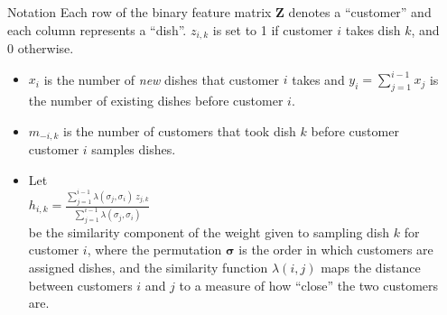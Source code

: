 \documentclass[serif,mathserif,final]{beamer}
\def\suml#1#2#3{\sum\limits_{#1=#2}^{#3}}
\def\ds{\displaystyle}
\def\hik{\ds\frac{\suml{j}{1}{i-1}\lambda(\sigma_j,\sigma_i)~z_{j,k}}
        {\suml{j}{1}{i-1}\lambda(\sigma_j,\sigma_i)}}
\begin{document}
\begin{frame}{}
\begin{columns}[t]
\begin{column}{0.4\linewidth}
    \end{column}%

    \begin{column}{0.56\linewidth}


     \begin{block}{Notation}
        Each row of the binary feature matrix $\bm Z$ denotes a ``customer''
        and each column represents a ``dish''. $z_{i,k}$ is set to 1 if
        customer $i$ takes dish $k$, and  0 otherwise. \\
        \vspace{1em}
        \begin{itemize}
          \setlength{\itemsep}{3pt}
          \item $x_i$ is the number of \textit{new} dishes that customer $i$ takes
            and $y_{i} = \suml{j}{1}{i-1} x_j$ is the number of existing dishes
            before customer $i$.
          \item $m_{-i,k}$ is the number of customers that took dish $k$ before customer
            customer $i$ samples dishes.
          \item Let \\\hspace{.25\textwidth} $h_{i,k} = \hik$ \\
            be the similarity component of the weight
            given to sampling dish $k$ for customer $i$, where the permutation
            $\bm\sigma$ is the order in which customers are assigned dishes, 
            and the similarity function $\lambda(i,j)$ maps the distance between
            customers $i$ and $j$ to a measure of how ``close'' the two customers
            are. 


\end{itemize}
\end{block}
\end{column}
\end{columns}
\end{frame}
\end{document}
